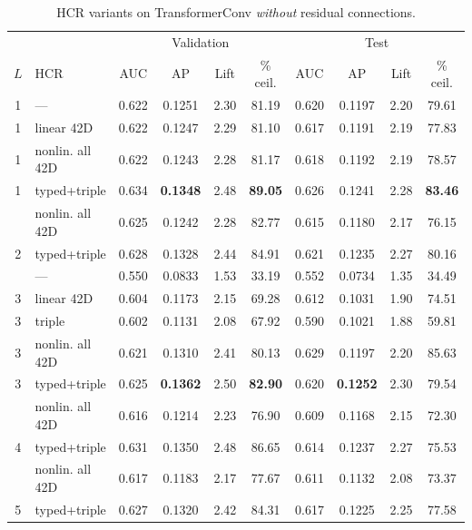 \begin{table}[htbp]
  \centering
  \small
  \setlength{\tabcolsep}{4pt}
  \caption{HCR variants on TransformerConv \emph{without} residual
    connections.}
  \label{tab:hcr-nores}
  \begin{tabular}{clcccccccc}
    \toprule
    & & \multicolumn{4}{c}{Validation} & \multicolumn{4}{c}{Test} \\
    \cmidrule(lr){3-6}\cmidrule(lr){7-10}
    $L$ & HCR & AUC & AP & Lift & \% ceil. & AUC & AP & Lift & \% ceil. \\
    \midrule
    1 & ---              & 0.622 & 0.1251 & 2.30 & 81.19 & 0.620 & 0.1197 & 2.20 & 79.61 \\
    1 & linear 42D       & 0.622 & 0.1247 & 2.29 & 81.10 & 0.617 & 0.1191 & 2.19 & 77.83 \\
    1 & nonlin. all 42D  & 0.622 & 0.1243 & 2.28 & 81.17 & 0.618 & 0.1192 & 2.19 & 78.57 \\
    1 & typed+triple     & 0.634 & \textbf{0.1348} & 2.48 & \textbf{89.05} & 0.626 & 0.1241 & 2.28 & \textbf{83.46} \\
    \addlinespace[4pt]
    2 & nonlin. all 42D  & 0.625 & 0.1242 & 2.28 & 82.77 & 0.615 & 0.1180 & 2.17 & 76.15 \\
    2 & typed+triple     & 0.628 & 0.1328 & 2.44 & 84.91 & 0.621 & 0.1235 & 2.27 & 80.16 \\
    \addlinespace[4pt]
    3 & ---              & 0.550 & 0.0833 & 1.53 & 33.19 & 0.552 & 0.0734 & 1.35 & 34.49 \\
    3 & linear 42D       & 0.604 & 0.1173 & 2.15 & 69.28 & 0.612 & 0.1031 & 1.90 & 74.51 \\
    3 & triple           & 0.602 & 0.1131 & 2.08 & 67.92 & 0.590 & 0.1021 & 1.88 & 59.81 \\
    3 & nonlin. all 42D  & 0.621 & 0.1310 & 2.41 & 80.13 & 0.629 & 0.1197 & 2.20 & 85.63 \\
    3 & typed+triple     & 0.625 & \textbf{0.1362} & 2.50 & \textbf{82.90} & 0.620 & \textbf{0.1252} & 2.30 & 79.54 \\
    \addlinespace[4pt]
    4 & nonlin. all 42D  & 0.616 & 0.1214 & 2.23 & 76.90 & 0.609 & 0.1168 & 2.15 & 72.30 \\
    4 & typed+triple     & 0.631 & 0.1350 & 2.48 & 86.65 & 0.614 & 0.1237 & 2.27 & 75.53 \\
    \addlinespace[4pt]
    5 & nonlin. all 42D  & 0.617 & 0.1183 & 2.17 & 77.67 & 0.611 & 0.1132 & 2.08 & 73.37 \\
    5 & typed+triple     & 0.627 & 0.1320 & 2.42 & 84.31 & 0.617 & 0.1225 & 2.25 & 77.58 \\

\end{tabular}
\end{table}
